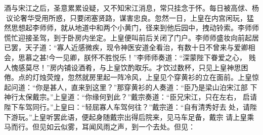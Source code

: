 酒与宋江之后，圣意累累设疑，又不知宋江消息，常只挂念于怀。每日被高俅、杨
议论奢华受用所惑，只要闭塞贤路，谋害忠良。忽然一日，上皇在内宫闲玩，猛
然思想起李师师，就从地道中和两个小黄门，径来到他后园中，拽动铃索。李师师
慌忙迎接圣驾，到于卧房内坐定。上皇便叫前后关闭了门户。李师师盛妆向前起居
已罢，天子道：“寡人近感微疾，现令神医安道全看治，有数十日不曾来与爱卿相
会，思慕之甚!今一见卿，朕怀不胜悦乐！”李师师奏道：“深蒙陛下眷爱之心，
贱人愧感莫尽！”房内铺设酒肴，与上皇饮酌取乐。才饮过数杯，只见上皇神思困
倦。点的灯烛荧煌，忽然就房里起一阵冷风，上皇见个穿黄衫的立在面前。上皇惊
起问道：“你是甚人，直来到这里？”那穿黄衫的人奏道：“臣乃是梁山泊宋江部
下神行太保戴宗。”上皇道：“你缘何到此？”戴宗奏道：“臣兄宋江，只在左右，
启请陛下车驾同行。”上皇曰：“轻屈寡人车驾何往？”戴宗道：“自有清秀好去
处，请陛下游玩。”上皇听罢此语，便起身随戴宗出得后院来，见马车足备，戴宗
请上皇乘马而行。但见如云似雾，耳闻风雨之声，到一个去处。但见：

